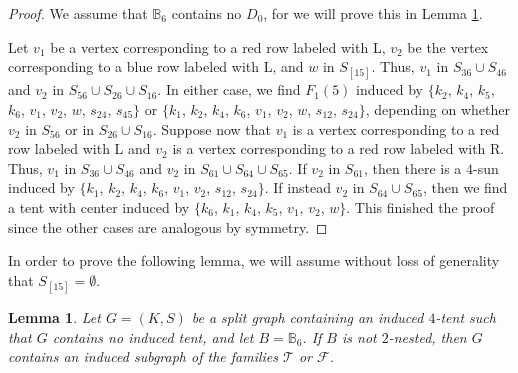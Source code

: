 \documentclass[12pt]{book}
\theoremstyle{plain}
\newtheorem{lema}[teo]{Lemma}
\newcounter{cases}
\theoremstyle{remark}
\begin{document}
\begin{proof}
	We assume that $\mathbb B_6$ contains no $D_0$, for we will prove this in Lemma \ref{lema:B6_2nested_4tent}.
	
	Let $v_1$ be a vertex corresponding to a red row labeled with L, $v_2$ be the vertex corresponding to a blue row labeled with L, and $w$ in $S_{[15]}$.
	Thus, $v_1$ in $S_{36} \cup S_{46}$ and $v_2$ in $S_{56} \cup S_{26} \cup S_{16}$. 
	In either case, we find $F_1(5)$ induced by $\{ k_2$, $k_4$, $k_5$, $k_6$, $v_1$, $v_2$, $w$, $s_{24}$, $s_{45} \}$ or $\{ k_1$, $k_2$, $k_4$, $k_6$, $v_1$, $v_2$, $w$, $s_{12}$, $s_{24} \}$, depending on whether $v_2$ in $S_{56}$ or in $S_{26} \cup S_{16}$.
	Suppose now that $v_1$ is a vertex corresponding to a red row labeled with L and $v_2$ is a vertex corresponding to a red row labeled with R. Thus, $v_1$ in $S_{36} \cup S_{46}$ and $v_2$ in $S_{61} \cup S_{64} \cup S_{65}$.
	 If $v_2$ in $S_{61}$, then there is a $4$-sun induced by $\{ k_1$, $k_2$, $k_4$, $k_6$, $v_1$, $v_2$, $s_{12}$, $s_{24} \}$. If instead $v_2$ in $S_{64} \cup S_{65}$, then we find a tent with center induced by $\{ k_6$, $k_1$, $k_4$, $k_5$, $v_1$, $v_2$, $w \}$.
	This finished the proof since the other cases are analogous by symmetry.
\end{proof}


In order to prove the following lemma, we will assume without loss of generality that $S_{[15]} = \emptyset$.

\begin{lema}\label{lema:B6_2nested_4tent}
	Let $G=(K,S)$ be a split graph containing an induced $4$-tent such that $G$ contains no induced tent, and let $B = \mathbb B_6$.
	 If $B$ is not $2$-nested, then $G$ contains an induced subgraph of the families $\mathcal{T}$ or $\mathcal{F}$.
\end{lema}
\end{document}
